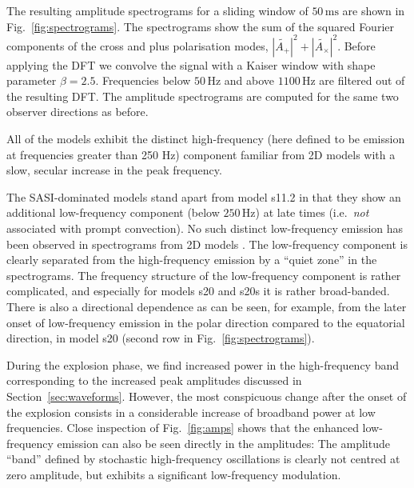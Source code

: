 The resulting amplitude spectrograms for a sliding window of $50 \, \mathrm{ms}$ are shown in
Fig.~\ref{fig:spectrograms}. The spectrograms show the sum of the squared Fourier
components of the cross and plus polarisation modes,
$|\widetilde{A_+}|^2 + |\widetilde{A_{\times}}|^2$. Before applying the
DFT we convolve the signal with a Kaiser window with shape parameter $\beta = 2.5$. Frequencies
below $50 \, \mathrm{Hz}$ and above $1100  \, \mathrm{Hz}$ are filtered out of the resulting DFT. The amplitude spectrograms are computed
for the same two observer directions as before.   

All of the models exhibit the distinct high-frequency (here defined to be emission at
frequencies greater than 250 Hz) component familiar from 2D models with a slow, secular increase in the peak frequency.

The SASI-dominated models stand apart from model s11.2 in that they show an additional low-frequency component
(below $250 \, \mathrm{Hz}$) at late times (i.e.\ \emph{not} associated with prompt
convection). No such distinct low-frequency emission has been observed in
spectrograms from 2D models \citep{murphy_09,mueller_13}. The
low-frequency component is clearly separated from the high-frequency
emission by a ``quiet zone'' in the spectrograms. The frequency
structure of the low-frequency component is rather complicated, and
especially for models s20 and s20s it is rather
broad-banded. There is also a directional dependence as can be seen, for example,
from the later onset of low-frequency emission in the polar direction compared to the equatorial direction, 
in model s20 (second row in Fig.~\ref{fig:spectrograms}).

During the explosion phase, we find increased power in the high-frequency band corresponding to the increased peak amplitudes discussed
in Section~\ref{sec:waveforms}. However, the most conspicuous change after the onset
of the explosion consists in a considerable increase
of broadband power at low frequencies.
Close inspection of Fig.~\ref{fig:amps} shows that
the enhanced low-frequency emission can also be seen
directly in the amplitudes: The amplitude
``band'' defined by stochastic high-frequency oscillations
is clearly not centred at zero amplitude, but
exhibits a significant low-frequency modulation.

